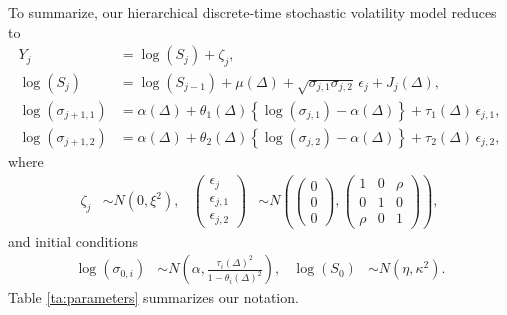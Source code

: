 To summarize, our hierarchical discrete-time stochastic volatility model reduces to
\begin{align}
  Y_j &= \log(S_j) + \zeta_j  ,   \label{eq:mod1}   \\
  \log(S_{j}) &= \log(S_{j-1}) + \mu(\Delta) + \sqrt{\sigma_{j,1}\sigma_{j,2}} \, \epsilon_{j} + J_j(\Delta)   ,  \label{eq:mod2}  \\
  \log(\sigma_{j+1,1}) &= \alpha(\Delta) + \theta_1(\Delta) \left\{ \log(\sigma_{j,1}) - \alpha(\Delta) \right\} + \tau_1(\Delta) \, \epsilon_{j,1}    ,  \label{eq:mod3}  \\
  \log(\sigma_{j+1,2}) &= \alpha(\Delta) + \theta_2(\Delta) \left\{ \log(\sigma_{j,2}) - \alpha(\Delta) \right\} + \tau_2(\Delta) \, \epsilon_{j,2}    , \label{eq:mod4}
\end{align}
where
\begin{align*}
  \zeta_j &\sim N(0, \xi^2)  ,  &
                                  \left( \begin{matrix} \epsilon_{j} \\
      \epsilon_{j,1} \\ \epsilon_{j,2} \end{matrix} \right) &\sim
                                            N \left( \left(\begin{matrix} 0 \\ 0 \\
	                                          0 \end{matrix}
                                              \right) ,
  \left( \begin{matrix} 1 & 0 & \rho \\
      0 & 1 & 0 \\
    \rho & 0 & 1 \end{matrix} \right) \right)  ,
\end{align*}
and initial conditions
\begin{align*}
  \log(\sigma_{0,i}) & \sim N \left( \alpha , \frac{\tau_i(\Delta)^2}{1 - \theta_i(\Delta)^2} \right)  ,  &   \log(S_0) & \sim N \left( \eta, \kappa^2 \right)  .
\end{align*}
Table \ref{ta:parameters} summarizes our notation.
%
